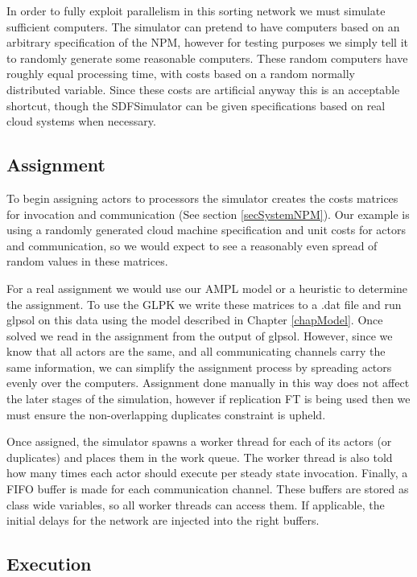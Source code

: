 In order to fully exploit parallelism in this sorting network we must simulate sufficient computers.
The simulator can pretend to have computers based on an arbitrary specification of the NPM, however for testing purposes we simply tell it to randomly generate some reasonable computers.
These random computers have roughly equal processing time, with costs based on a random normally distributed variable.
Since these costs are artificial anyway this is an acceptable shortcut, though the SDFSimulator can be given specifications based on real cloud systems when necessary.

\subsection{Assignment}

To begin assigning actors to processors the simulator creates the costs matrices for invocation and communication (See section \ref{secSystemNPM}).
Our example is using a randomly generated cloud machine specification and unit costs for actors and communication, so we would expect to see a reasonably even spread of random values in these matrices.

For a real assignment we would use our AMPL model or a heuristic to determine the assignment.
To use the GLPK we write these matrices to a .dat file and run glpsol on this data using the model described in Chapter \ref{chapModel}.
Once solved we read in the assignment from the output of glpsol.
However, since we know that all actors are the same, and all communicating channels carry the same information, we can simplify the assignment process by spreading actors evenly over the computers.
Assignment done manually in this way does not affect the later stages of the simulation, however if replication FT is being used then we must ensure the non-overlapping duplicates constraint is upheld.

Once assigned, the simulator spawns a worker thread for each of its actors (or duplicates) and places them in the work queue.
The worker thread is also told how many times each actor should execute per steady state invocation.
Finally, a FIFO buffer is made for each communication channel.
These buffers are stored as class wide variables, so all worker threads can access them.
If applicable, the initial delays for the network are injected into the right buffers.

\subsection{Execution}

